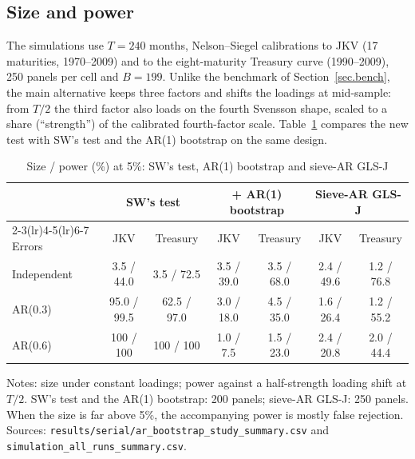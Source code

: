 \documentclass[11pt]{article}
\begin{document}
\subsection{Size and power}\label{sec.robust.mc}

The simulations use $T=240$ months, Nelson--Siegel calibrations to JKV (17 maturities, 1970--2009) and to the eight-maturity Treasury curve (1990--2009), 250 panels per cell and $B=199$. Unlike the benchmark of Section~\ref{sec.bench}, the main alternative keeps three factors and shifts the loadings at mid-sample: from $T/2$ the third factor also loads on the fourth Svensson shape, scaled to a share (``strength'') of the calibrated fourth-factor scale. Table~\ref{tab.robust.sp} compares the new test with SW's test and the AR(1) bootstrap on the same design.

\begin{table}[htbp]
\centering
\begin{threeparttable}
\small
\caption{Size / power (\%) at 5\%: SW's test, AR(1) bootstrap and sieve-AR GLS-J}\label{tab.robust.sp}
\begin{tabular}{lcccccc}
\toprule
& \multicolumn{2}{c}{SW's test} & \multicolumn{2}{c}{+ AR(1) bootstrap} & \multicolumn{2}{c}{Sieve-AR GLS-J}\\
\cmidrule(lr){2-3}\cmidrule(lr){4-5}\cmidrule(lr){6-7}
Errors & JKV & Treasury & JKV & Treasury & JKV & Treasury\\
\midrule
Independent & 3.5 / 44.0 & 3.5 / 72.5 & 3.5 / 39.0 & 3.5 / 68.0 & 2.4 / 49.6 & 1.2 / 76.8\\
AR(0.3) & 95.0 / 99.5 & 62.5 / 97.0 & 3.0 / 18.0 & 4.5 / 35.0 & 1.6 / 26.4 & 1.2 / 55.2\\
AR(0.6) & 100 / 100 & 100 / 100 & 1.0 / 7.5 & 1.5 / 23.0 & 2.4 / 20.8 & 2.0 / 44.4\\
\bottomrule
\end{tabular}
\begin{tablenotes}\small
\item Notes: size under constant loadings; power against a half-strength loading shift at $T/2$. SW's test and the AR(1) bootstrap: 200 panels; sieve-AR GLS-J: 250 panels. When the size is far above 5\%, the accompanying power is mostly false rejection. Sources: \texttt{results/serial/ar\_bootstrap\_study\_summary.csv} and \texttt{simulation\_all\_runs\_summary.csv}.
\end{tablenotes}
\end{threeparttable}
\end{table}
\end{document}
